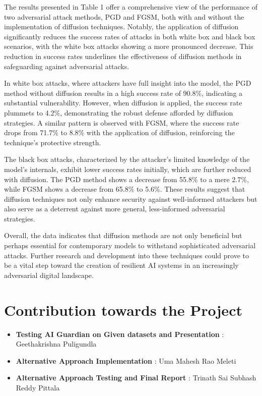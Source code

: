 \documentclass[letterpaper,twocolumn,10pt]{article}
\begin{document}
The results presented in Table 1 offer a comprehensive view of the performance of two adversarial attack methods, PGD and FGSM, both with and without the implementation of diffusion techniques. Notably, the application of diffusion significantly reduces the success rates of attacks in both white box and black box scenarios, with the white box attacks showing a more pronounced decrease. This reduction in success rates underlines the effectiveness of diffusion methods in safeguarding against adversarial attacks.

In white box attacks, where attackers have full insight into the model, the PGD method without diffusion results in a high success rate of 90.8\%, indicating a substantial vulnerability. However, when diffusion is applied, the success rate plummets to 4.2\%, demonstrating the robust defense afforded by diffusion strategies. A similar pattern is observed with FGSM, where the success rate drops from 71.7\% to 8.8\% with the application of diffusion, reinforcing the technique's protective strength.

The black box attacks, characterized by the attacker's limited knowledge of the model's internals, exhibit lower success rates initially, which are further reduced with diffusion. The PGD method shows a decrease from 55.8\% to a mere 2.7\%, while FGSM shows a decrease from 65.8\% to 5.6\%. These results suggest that diffusion techniques not only enhance security against well-informed attackers but also serve as a deterrent against more general, less-informed adversarial strategies.

Overall, the data indicates that diffusion methods are not only beneficial but perhaps essential for contemporary models to withstand sophisticated adversarial attacks. Further research and development into these techniques could prove to be a vital step toward the creation of resilient AI systems in an increasingly adversarial digital landscape.


\section{Contribution towards the Project}


\begin{itemize}
    \item \textbf{Testing AI Guardian on Given datasets and Presentation} : Geethakrishna Puligundla
    \item \textbf{Alternative Approach Implementation} : Uma Mahesh Rao Meleti
    \item \textbf{Alternative Approach Testing and Final Report} : Trinath Sai Subhash Reddy Pittala
\end{itemize}
\end{document}
